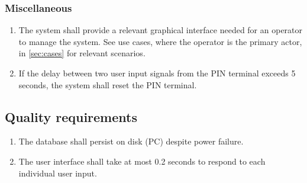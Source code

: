 \documentclass[12pt,titlepage,bibliography=totoc]{article}
\begin{document}
\subsubsection{Miscellaneous}
\begin{enumerate}
	\item The system shall provide a relevant graphical interface needed for an operator to manage the system. See use cases, where the operator is the primary actor, in \cref{sec:cases} for relevant scenarios.
	\item If the delay between two user input signals from the PIN terminal exceeds 5 seconds, the system shall reset the PIN terminal.
\end{enumerate}
\subsection{Quality requirements}
\begin{enumerate}
	\item The database shall persist on disk (PC) despite power failure.
	\item The user interface shall take at most 0.2 seconds to respond to each individual user input.
\end{enumerate}
{}


\end{document}
